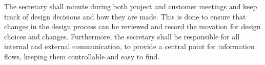 	The secretary shall minute during both project and customer meetings and keep track of design decisions and how they are made. This is done to ensure that changes in the design process can be reviewed and record the movation for design choices and changes. Furthermore, the secretary shall be responsible for all internal and external communication, to provide a central point for information flows, keeping them controllable and easy to find.